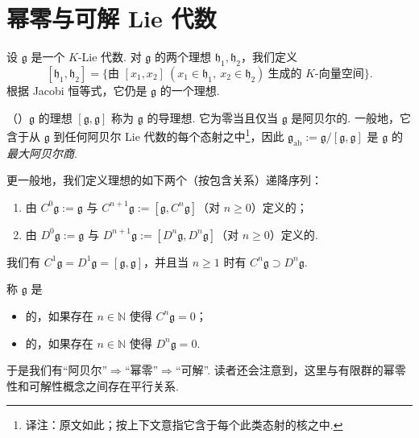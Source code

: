 \section{幂零与可解 Lie 代数}\label{sec:lie-2-3}

设 $\mathfrak g$ 是一个 $K$-Lie 代数. 对 $\mathfrak g$ 的两个理想 $\mathfrak h_{1},\mathfrak h_{2}$，我们定义
\[
[\mathfrak h_{1},\mathfrak h_{2}]=\{\text{由 }[x_{1},x_{2}]\ (x_{1}\in\mathfrak h_{1},\ x_{2}\in\mathfrak h_{2})\ \text{生成的 }K\text{-向量空间}\}.
\]
根据 Jacobi 恒等式，它仍是 $\mathfrak g$ 的一个理想.
\begin{example*}
（）$\mathfrak g$ 的理想 $[\mathfrak g,\mathfrak g]$ 称为 $\mathfrak g$ 的导理想. 它为零当且仅当 $\mathfrak g$ 是阿贝尔的. 一般地，它含于从 $\mathfrak g$ 到任何阿贝尔 Lie 代数的每个态射之中\footnote{译注：原文如此；按上下文意指它含于每个此类态射的核之中.}，因此 $\mathfrak g_{\mathrm{ab}}:=\mathfrak g/[\mathfrak g,\mathfrak g]$ 是 $\mathfrak g$ 的\emph{最大阿贝尔商}.
\end{example*}
更一般地，我们定义理想的如下两个（按包含关系）递降序列：
\begin{enumerate}[label=\roman*)]
\item 由 $C^{0}\mathfrak g:=\mathfrak g$ 与 $C^{n+1}\mathfrak g:=[\mathfrak g,C^{n}\mathfrak g]$（对 $n\geqslant 0$）定义的；
\item 由 $D^{0}\mathfrak g:=\mathfrak g$ 与 $D^{n+1}\mathfrak g:=[D^{n}\mathfrak g,D^{n}\mathfrak g]$（对 $n\geqslant 0$）定义的.
\end{enumerate}
我们有 $C^{1}\mathfrak g=D^{1}\mathfrak g=[\mathfrak g,\mathfrak g]$，并且当 $n\geqslant 1$ 时有 $C^{n}\mathfrak g\supset D^{n}\mathfrak g$.
\begin{definition}\label{def:lie-2-3-1}
称 $\mathfrak g$ 是
\begin{itemize}[label=--]
\item {}的，如果存在 $n\in\mathbb N$ 使得 $C^{n}\mathfrak g=0$；
\item {}的，如果存在 $n\in\mathbb N$ 使得 $D^{n}\mathfrak g=0$.
\end{itemize}
\end{definition}
于是我们有``阿贝尔''$\Rightarrow$``幂零''$\Rightarrow$``可解''. 读者还会注意到，这里与有限群的幂零性和可解性概念之间存在平行关系.
